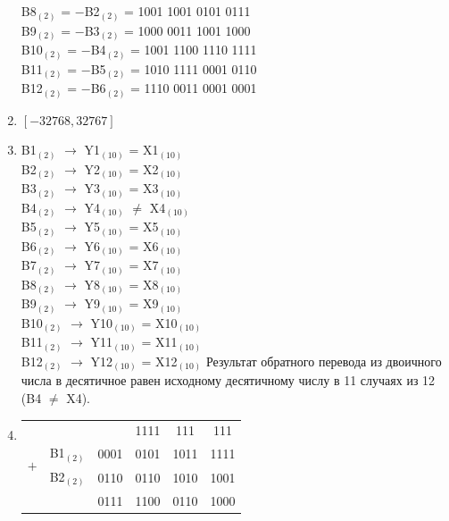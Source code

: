 \documentclass[11pt]{article}
\begin{document}
\begin{paracol}{2}
\begin{enumerate}
		B8$_{(2)}$\phantom{0} = $-$B2$_{(2)}$ = 1001 1001 0101 0111\\
		B9$_{(2)}$ \phantom{0}= $-$B3$_{(2)}$ = 1000 0011 1001 1000\\
		B10$_{(2)}$ = $-$B4$_{(2)}$ = 1001 1100 1110 1111\\
		B11$_{(2)}$ = $-$B5$_{(2)}$ = 1010 1111 0001 0110\\
		B12$_{(2)}$ = $-$B6$_{(2)}$ = 1110 0011 0001 0001
	\item $[-32768,32767]$
	\item 
		B1$_{(2)}$\phantom{0} $\rightarrow$ Y1$_{(10)}$\phantom{0} = X1$_{(10)}$\\
		B2$_{(2)}$\phantom{0} $\rightarrow$ Y2$_{(10)}$\phantom{0} = X2$_{(10)}$\\
		B3$_{(2)}$\phantom{0} $\rightarrow$ Y3$_{(10)}$\phantom{0} = X3$_{(10)}$\\
		B4$_{(2)}$\phantom{0} $\rightarrow$ Y4$_{(10)}$\phantom{0} $\neq$ X4$_{(10)}$\\
		B5$_{(2)}$\phantom{0} $\rightarrow$ Y5$_{(10)}$\phantom{0} = X5$_{(10)}$\\
		B6$_{(2)}$\phantom{0} $\rightarrow$ Y6$_{(10)}$\phantom{0} = X6$_{(10)}$\\
		B7$_{(2)}$\phantom{0} $\rightarrow$ Y7$_{(10)}$\phantom{0} = X7$_{(10)}$\\
		B8$_{(2)}$\phantom{0} $\rightarrow$ Y8$_{(10)}$\phantom{0} = X8$_{(10)}$\\
		B9$_{(2)}$\phantom{0} $\rightarrow$ Y9$_{(10)}$\phantom{0} = X9$_{(10)}$\\
		B10$_{(2)}$ $\rightarrow$ Y10$_{(10)}$ = X10$_{(10)}$\\
		B11$_{(2)}$ $\rightarrow$ Y11$_{(10)}$ = X11$_{(10)}$\\
		B12$_{(2)}$ $\rightarrow$ Y12$_{(10)}$ = X12$_{(10)}$
	\switchcolumn
	\setcounter{enumi}{7}
		Результат обратного перевода из двоичного числа в десятичное равен исходному десятичному числу
		в 11 случаях из 12 (B4 $\neq$ X4).\\
	\item 
		\begin{tabular}[t]{cccccc}
			&       &                                                & 1111   & \phantom{1}111 &111\phantom{1}\\
			\multirow{2}{*}{$+$} & B1$_{(2)}$ & 0001 & 0101 & 1011 & 1111\\
						          & B2$_{(2)}$ & 0110 & 0110 & 1010 &  1001\\
			\cline{2-6}
						       &        & 0111 & 1100 & 0110 & 1000\\

\end{tabular}
\end{enumerate}
\end{paracol}
\end{document}
